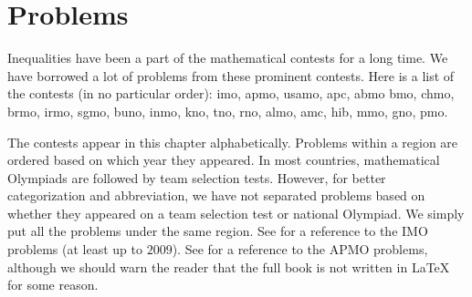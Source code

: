 \documentclass{subfile}
\begin{document}
	\chapter{Problems}\label{ch:problems}
	Inequalities have been a part of the mathematical contests for a long time. We have borrowed a lot of problems from these prominent contests. Here is a list of the contests (in no particular order): \Gls{imo}, \Gls{apmo}, \Gls{usamo}, \Gls{apc}, \Gls{abmo} \Gls{bmo}, \Gls{chmo}, \Gls{brmo}, \Gls{irmo}, \Gls{sgmo}, \Gls{buno}, \Gls{inmo}, \Gls{kno}, \Gls{tno}, \Gls{rno}, \Gls{almo}, \Gls{amc}, \Gls{hib}, \Gls{mmo}, \Gls{gno}, \Gls{pmo}.
	
	The contests appear in this chapter alphabetically. Problems within a region are ordered based on which year they appeared. In most countries, mathematical Olympiads are followed by team selection tests. However, for better categorization and abbreviation, we have not separated problems based on whether they appeared on a team selection test or national Olympiad. We simply put all the problems under the same region. See \textcite{djukicc_jankovic_matic_2011} for a reference to the IMO problems (at least up to $2009$). See \textcite{dongphd_suugaku_2009} for a reference to the APMO problems, although we should warn the reader that the full book is not written in \LaTeX{} for some reason.
\end{document}
